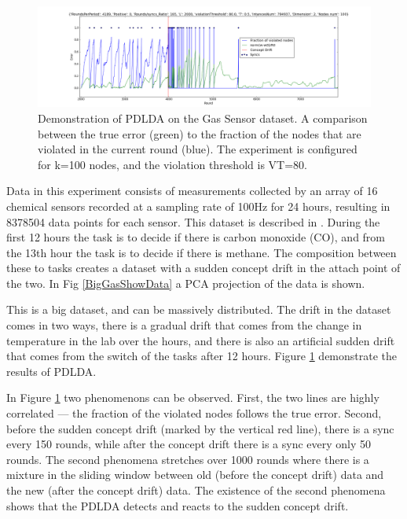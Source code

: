\documentclass[11pt,twocolumn,varwidth=true,a4paper,fleqn]{article}
\begin{document}
\begin{figure}[ht!]
\centering
\includegraphics[width=\textwidth]{BigGas/overTime100k.png}
\caption{Demonstration of PDLDA on the Gas Sensor dataset. 
A comparison between the true error (green) to the fraction of the nodes that 
are violated in the current round (blue). 
The experiment is configured for k=100 nodes, and the violation threshold is
VT=80.}
\label{BigGasOverTime}
\end{figure}
Data in this experiment consists of measurements collected
by an array of 16 chemical sensors recorded at a sampling
rate of 100Hz for 24 hours, resulting in 8378504 data points for each sensor. 
This dataset is described in \cite{bigGas}.
During the first 12 hours the task is to decide if there is carbon monoxide
(CO), and from the 13th hour the task is to decide if there is methane. 
The composition between these to tasks creates a dataset with a sudden concept
drift in the attach point of the two.  
In Fig \ref{BigGasShowData} a PCA projection of the data is shown.


This is a big dataset, and can be massively distributed. The drift in
the dataset comes in two ways, there is a gradual drift that comes from 
the change in temperature in the lab over the hours, and there is also an
artificial sudden drift that comes from the switch of the tasks after 12 hours.
Figure \ref{BigGasOverTime} demonstrate the results of PDLDA.

In Figure \ref{BigGasOverTime} two phenomenons can be observed.
First, the two lines are highly correlated --- the fraction of the violated
nodes follows the true error. Second,  before the sudden concept drift 
(marked by the vertical red line), there is a sync every 150 rounds, while 
after the concept drift there is a sync every only 50 rounds.
The second phenomena stretches over 1000 rounds where there is a mixture in the 
sliding window between old (before the concept drift) data and the new 
(after the concept drift) data. The existence of the second phenomena shows that
the PDLDA detects and reacts to the sudden concept drift.
\end{document}
